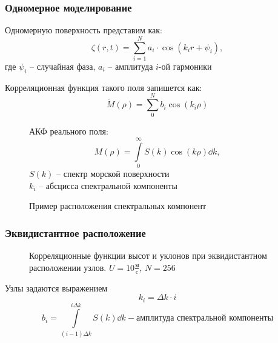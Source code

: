 \documentclass[10pt,pdf,hyperref={unicode}, dvipsnames]{beamer}
\newcommand{\tM}{\widetilde{M}}
\begin{document}
\begin{frame}[t]\frametitle{Одномерное моделирование}
\vskip -10pt
Одномерную поверхность представим как:
\begin{equation}
	\zeta(r, t)= \sum\limits_{i=1}^N a_i\cdot 
		\cos(k_ir + \psi_{i}),
\end{equation}
где $\psi_i$ -- случайная фаза, $a_i$ -- амплитуда $i$-ой гармоники

Корреляционная функция такого поля запишется как: 
    \begin{equation*}
    	\tM(\rho)=\sum\limits_0^{N} b_i \cos(k_i \rho)
    \end{equation*}


\vskip -12pt
\begin{figure}[H]
	\begin{minipage}{0.49\linewidth}
			\centering
			\caption{Пример расположения спектральных компонент}	
	\end{minipage}
	\hfill
	\begin{minipage}{0.49\linewidth}
		АКФ реального поля:
		\begin{equation}
			M(\rho)=\int\limits_0^{\infty} S(k)\cos(k \rho) \dd{k},
		\end{equation}
		$S(k)$ -- спектр морской поверхности \\
	    $k_i$ -- абсцисса спектральной компоненты
 
    	
	\end{minipage}
	\label{fig:splits}		
\end{figure}

\end{frame}
\begin{frame}[t]\frametitle{Эквидистантное расположение}
	\begin{figure}[h!]
		\begin{minipage}{0.49\textheight}
				\centering
				\label{fig:ch0}		
		\end{minipage}
		\hfill
		\begin{minipage}{0.49\linewidth}
				\centering
		\end{minipage}
		\caption{Корреляционные функции высот и уклонов при эквидистантном расположении узлов. $U=10 \frac{\text{м}}{\text{c}}$, $N=256$}
				\label{fig:ca0}		
	\vspace{-20pt}
	\end{figure}
	Узлы задаются выражением
	\begin{equation}
		k_i=\Delta k\cdot i
	\end{equation}
	\begin{equation*}
	b_i = \int\limits_{(i-1)\Delta k}^{i \Delta k} S(k) \dd{k} -
	\text{амплитуда спектральной компоненты}
	\end{equation*}


\end{frame}
\end{document}
